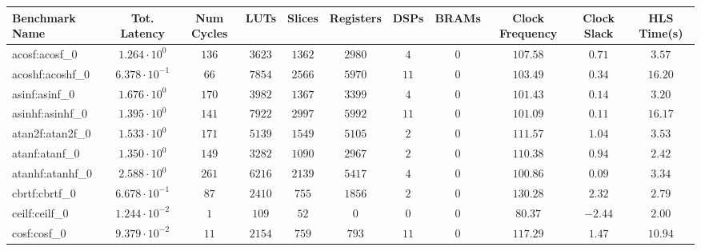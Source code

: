 \begin{tabular}{|l|c|c|c|c|c|c|c|c|c|c|}
\hline
Benchmark Name               & Tot. Latency            & Num Cycles & LUTs       & Slices    & Registers & DSPs    & BRAMs & Clock Frequency & Clock Slack & HLS Time(s) \\
\hline
acosf:acosf\_0               & $ 1.264 \cdot 10^{0}  $ & $ 136    $ & $ 3623   $ & $ 1362  $ & $ 2980  $ & $ 4   $ & $ 0 $ & $ 107.58      $ & $ 0.71    $ & $ 3.57    $ \\
acoshf:acoshf\_0             & $ 6.378 \cdot 10^{-1} $ & $ 66     $ & $ 7854   $ & $ 2566  $ & $ 5970  $ & $ 11  $ & $ 0 $ & $ 103.49      $ & $ 0.34    $ & $ 16.20   $ \\
asinf:asinf\_0               & $ 1.676 \cdot 10^{0}  $ & $ 170    $ & $ 3982   $ & $ 1367  $ & $ 3399  $ & $ 4   $ & $ 0 $ & $ 101.43      $ & $ 0.14    $ & $ 3.20    $ \\
asinhf:asinhf\_0             & $ 1.395 \cdot 10^{0}  $ & $ 141    $ & $ 7922   $ & $ 2997  $ & $ 5992  $ & $ 11  $ & $ 0 $ & $ 101.09      $ & $ 0.11    $ & $ 16.17   $ \\
atan2f:atan2f\_0             & $ 1.533 \cdot 10^{0}  $ & $ 171    $ & $ 5139   $ & $ 1549  $ & $ 5105  $ & $ 2   $ & $ 0 $ & $ 111.57      $ & $ 1.04    $ & $ 3.53    $ \\
atanf:atanf\_0               & $ 1.350 \cdot 10^{0}  $ & $ 149    $ & $ 3282   $ & $ 1090  $ & $ 2967  $ & $ 2   $ & $ 0 $ & $ 110.38      $ & $ 0.94    $ & $ 2.42    $ \\
atanhf:atanhf\_0             & $ 2.588 \cdot 10^{0}  $ & $ 261    $ & $ 6216   $ & $ 2139  $ & $ 5417  $ & $ 4   $ & $ 0 $ & $ 100.86      $ & $ 0.09    $ & $ 3.34    $ \\
cbrtf:cbrtf\_0               & $ 6.678 \cdot 10^{-1} $ & $ 87     $ & $ 2410   $ & $ 755   $ & $ 1856  $ & $ 2   $ & $ 0 $ & $ 130.28      $ & $ 2.32    $ & $ 2.79    $ \\
ceilf:ceilf\_0               & $ 1.244 \cdot 10^{-2} $ & $ 1      $ & $ 109    $ & $ 52    $ & $ 0     $ & $ 0   $ & $ 0 $ & $ 80.37       $ & $ -2.44   $ & $ 2.00    $ \\
cosf:cosf\_0                 & $ 9.379 \cdot 10^{-2} $ & $ 11     $ & $ 2154   $ & $ 759   $ & $ 793   $ & $ 11  $ & $ 0 $ & $ 117.29      $ & $ 1.47    $ & $ 10.94   $ \\

\end{tabular}

